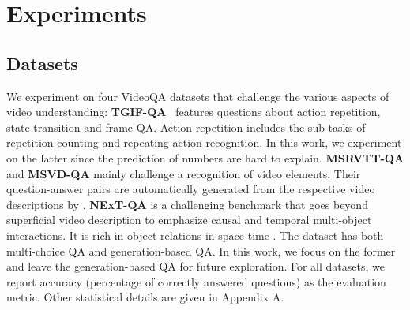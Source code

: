 \documentclass[letterpaper]{article} \usepackage{aaai21}  \usepackage{times}  \usepackage{helvet} \usepackage{courier}  \usepackage[hyphens]{url}  \usepackage{graphicx} \urlstyle{rm} \def\UrlFont{\rm}  \usepackage{natbib}  \usepackage{caption} \usepackage{color, colortbl}
\begin{document}
\section{Experiments}
\subsection{Datasets}
We experiment on four VideoQA datasets that challenge the various aspects of video understanding:
\textbf{TGIF-QA}~\cite{jang2019video} features questions about action repetition, state transition and frame QA. Action repetition includes the sub-tasks of repetition counting and repeating action recognition. In this work, we experiment on the latter since the prediction of numbers are hard to explain. 
\textbf{MSRVTT-QA} and \textbf{MSVD-QA} mainly challenge a recognition of video elements. Their question-answer pairs are automatically generated from the respective video descriptions by \cite{xu2017video}. \textbf{NExT-QA} \cite{xiao2021next} is a challenging benchmark that goes beyond superficial video description to emphasize causal and temporal multi-object interactions. It is rich in object relations in space-time \cite{shang2019annotating}. The dataset has both multi-choice QA and generation-based QA. In this work, we focus on the former and leave the generation-based QA for future exploration. For all datasets, we report accuracy (percentage of correctly answered questions) as the evaluation metric. Other statistical details are given in Appendix A.
\end{document}

